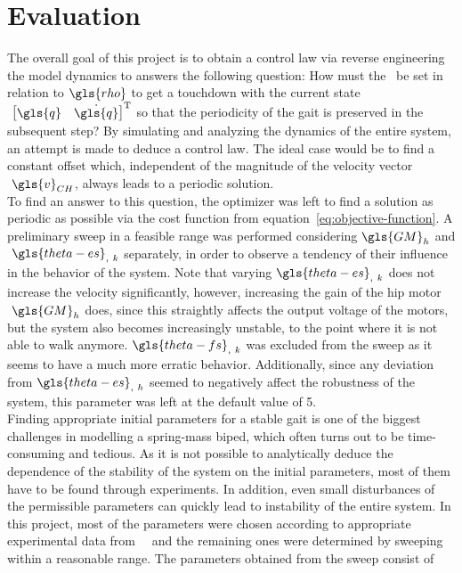 \chapter{Evaluation}%
\label{sec:evaluation}

The overall goal of this project is to obtain a control law via reverse engineering the model dynamics to answers the following question: How must the~ be set in relation to$~\gls{rho}$ to get a touchdown with the current state$~\begin{bmatrix} \gls{q} & \dot{\gls{q}} \end{bmatrix}^\textrm{T}$ so that the periodicity of the gait is preserved in the subsequent step? By simulating and analyzing the dynamics of the entire system, an attempt is made to deduce a control law. The ideal case would be to find a constant offset which, independent of the magnitude of the velocity vector$~\gls{v}_{CH}$, always leads to a periodic solution. \\

To find an answer to this question, the optimizer was left to find a solution as periodic as possible via the cost function from equation~\ref{eq:objective-function}. A preliminary sweep in a feasible range was performed considering$~\gls{GM}_h$ and$~\gls{theta-es}_{,~k}$ separately, in order to observe a tendency of their influence in the behavior of the system. Note that varying$~\gls{theta-es}_{,~k}$ does not increase the velocity significantly, however, increasing the gain of the hip motor$~\gls{GM}_h$ does, since this straightly affects the output voltage of the motors, but the system also becomes increasingly unstable, to the point where it is not able to walk anymore.$~\gls{theta-fs}_{,~k}$ was excluded from the sweep as it seems to have a much more erratic behavior. Additionally, since any deviation from$~\gls{theta-es}_{,~h}$ seemed to negatively affect the robustness of the system, this parameter was left at the default value of 5. \\

Finding appropriate initial parameters for a stable gait is one of the biggest challenges in modelling a spring-mass biped, which often turns out to be time-consuming and tedious. As it is not possible to analytically deduce the dependence of the stability of the system on the initial parameters, most of them have to be found through experiments. In addition, even small disturbances of the permissible parameters can quickly lead to instability of the entire system. In this project, most of the parameters were chosen according to appropriate experimental data from~\citeauthor*{Geng2006}~\cite{Geng2006} and the remaining ones were determined by sweeping within a reasonable range. The parameters obtained from the sweep consist of

